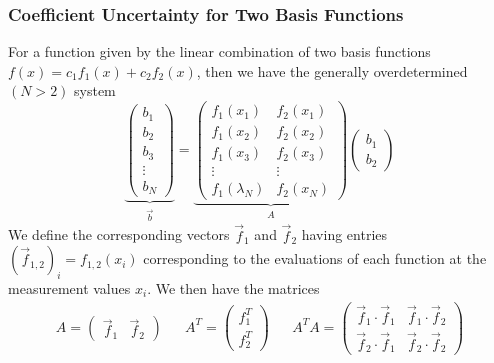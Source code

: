 \subsubsection{Coefficient Uncertainty for Two Basis Functions}
For a function given by the linear combination of two basis functions \newline $f(x) = c_1 f_1(x) + c_2 f_2(x)$, then we have the generally overdetermined $(N>2)$ system
\begin{equation*}
	\underbrace{\begin{pmatrix}
			b_1 \\
			b_2 \\
			b_3 \\
			\vdots \\
			b_N
	\end{pmatrix}}_{\begin{matrix}\vec{b}\end{matrix}} =
	\underbrace{\begin{pmatrix}
			f_1(x_1) &  f_2(x_1) \\
			f_1(x_2) &  f_2(x_2) \\
			f_1(x_3) &  f_2(x_3) \\
			\vdots & \vdots \\
			f_1(\lambda_N) & f_2(x_N)
	\end{pmatrix}}_{\begin{matrix}A\end{matrix}}
	\begin{pmatrix}
		b_1 \\
		b_2
	\end{pmatrix}
\end{equation*}
We define the corresponding vectors $\vec{f}_1$ and $\vec{f}_2$ having entries $\left(\vec{f}_{1,2}\right)_i = f_{1,2}(x_i)$ corresponding to the evaluations of each function at the measurement values $x_i$. We then have the matrices
\begin{align}
	A =
	\begin{pmatrix}
		\vec{f}_1 & \vec{f}_2
	\end{pmatrix}
	&&
	A^T =
	\begin{pmatrix}
		f_1^T \\ f_2^T
	\end{pmatrix}
	&&
	A^T A =
	\begin{pmatrix}
		\vec{f}_1 \cdot \vec{f}_1 & \vec{f}_1 \cdot \vec{f}_2 \\
		\vec{f}_2 \cdot \vec{f}_1 & \vec{f}_2 \cdot \vec{f}_2
	\end{pmatrix}
\end{align}
